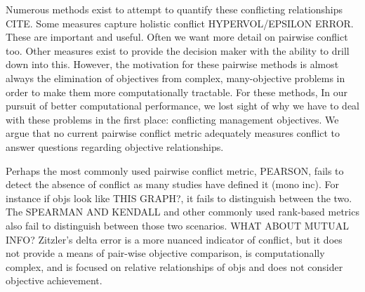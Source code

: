 Numerous methods exist to attempt to quantify these conflicting relationships CITE. Some measures capture holistic conflict HYPERVOL/EPSILON ERROR. These are important and useful. Often we want more detail on pairwise conflict too. Other measures exist to provide the decision maker with the ability to drill down into this. However, the motivation for these pairwise methods is almost always the elimination of objectives from complex, many-objective problems in order to make them more computationally tractable. For these methods, In our pursuit of better computational performance, we lost sight of why we have to deal with these problems in the first place: conflicting management objectives. We argue that no current pairwise conflict metric adequately measures conflict to answer questions regarding objective relationships.

Perhaps the most commonly used pairwise conflict metric, PEARSON, fails to detect the absence of conflict as many studies have defined it (mono inc).
For instance if objs look like THIS GRAPH?, it fails to distinguish between the two. The SPEARMAN AND KENDALL and other commonly used rank-based metrics also fail to distinguish between those two scenarios. WHAT ABOUT MUTUAL INFO? Zitzler's delta error is a more nuanced indicator of conflict, but it does not provide a means of pair-wise objective comparison, is computationally complex, and is focused on relative relationships of objs and does not consider objective achievement.

